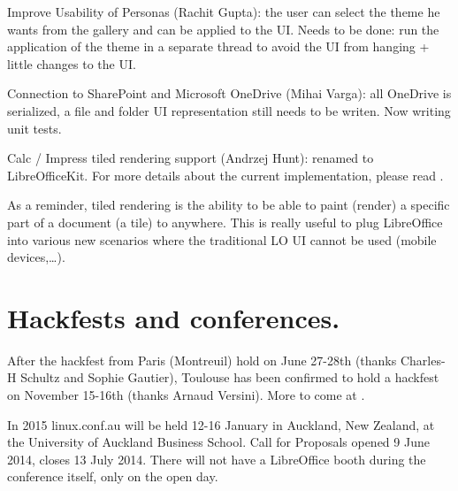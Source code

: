 \documentclass{article}
\begin{document}
Improve Usability of Personas (Rachit Gupta): the user can select the theme he
wants from the gallery and can be applied to the UI.  Needs to be done: run the
application of the theme in a separate thread to avoid the UI from hanging
+ little changes to the UI.

Connection to SharePoint and Microsoft OneDrive (Mihai Varga): all OneDrive is
serialized, a file and folder UI representation still needs to be writen. Now
writing unit tests.

Calc / Impress tiled rendering support (Andrzej Hunt): renamed to
LibreOfficeKit. For more details about the current implementation, please read
\cite{tiledRenderingArticle}.

As a reminder, tiled rendering is the ability to be able to paint (render)
a specific part of a document (a tile) to anywhere. This is really useful to
plug LibreOffice into various new scenarios where the traditional LO UI cannot
be used (mobile devices,\ldots).



\section{Hackfests and conferences.}

After the hackfest from Paris (Montreuil) hold on June 27-28th (thanks
Charles-H Schultz and Sophie Gautier), Toulouse has been confirmed to hold
a hackfest on November 15-16th\cite{hackfestToulouse} (thanks Arnaud Versini).
More to come at \cite{hackfestToulouseWiki}.

In 2015 linux.conf.au will be held 12-16 January in Auckland, New Zealand, at
the University of Auckland Business School.  Call for Proposals opened 9 June
2014, closes 13 July 2014\cite{linuxConfAuckland1}. There will not have
a LibreOffice booth during the conference itself, only on the open
day\cite{linuxConfAuckland2}.
\end{document}
